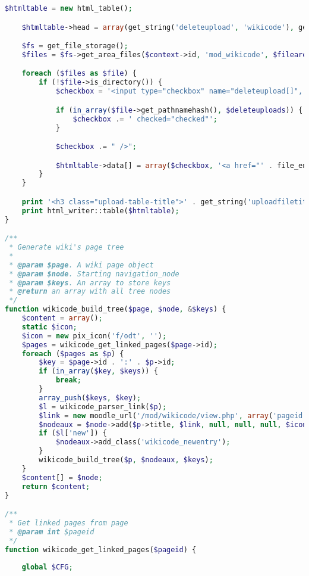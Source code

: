 \begin{lstlisting}[language=PHP]
    $htmltable = new html_table();

    $htmltable->head = array(get_string('deleteupload', 'wikicode'), get_string('uploadname', 'wikicode'), get_string('uploadactions', 'wiki'));

    $fs = get_file_storage();
    $files = $fs->get_area_files($context->id, 'mod_wikicode', $filearea, $fileitemid); //TODO: this is weird (skodak)

    foreach ($files as $file) {
        if (!$file->is_directory()) {
            $checkbox = '<input type="checkbox" name="deleteupload[]", value="' . $file->get_pathnamehash() . '"';

            if (in_array($file->get_pathnamehash(), $deleteuploads)) {
                $checkbox .= ' checked="checked"';
            }

            $checkbox .= " />";

            $htmltable->data[] = array($checkbox, '<a href="' . file_encode_url($CFG->wwwroot . '/pluginfile.php', '/' . $context->id . '/wikicode_upload/' . $fileitemid . '/' . $file->get_filename()) . '">' . $file->get_filename() . '</a>', "");
        }
    }

    print '<h3 class="upload-table-title">' . get_string('uploadfiletitle', 'wikicode') . "</h3>";
    print html_writer::table($htmltable);
}

/**
 * Generate wiki's page tree
 *
 * @param $page. A wiki page object
 * @param $node. Starting navigation_node
 * @param $keys. An array to store keys
 * @return an array with all tree nodes
 */
function wikicode_build_tree($page, $node, &$keys) {
    $content = array();
    static $icon;
    $icon = new pix_icon('f/odt', '');
    $pages = wikicode_get_linked_pages($page->id);
    foreach ($pages as $p) {
        $key = $page->id . ':' . $p->id;
        if (in_array($key, $keys)) {
            break;
        }
        array_push($keys, $key);
        $l = wikicode_parser_link($p);
        $link = new moodle_url('/mod/wikicode/view.php', array('pageid' => $p->id));
        $nodeaux = $node->add($p->title, $link, null, null, null, $icon);
        if ($l['new']) {
            $nodeaux->add_class('wikicode_newentry');
        }
        wikicode_build_tree($p, $nodeaux, $keys);
    }
    $content[] = $node;
    return $content;
}

/**
 * Get linked pages from page
 * @param int $pageid
 */
function wikicode_get_linked_pages($pageid) {
	
	global $CFG;
    

\end{lstlisting}
